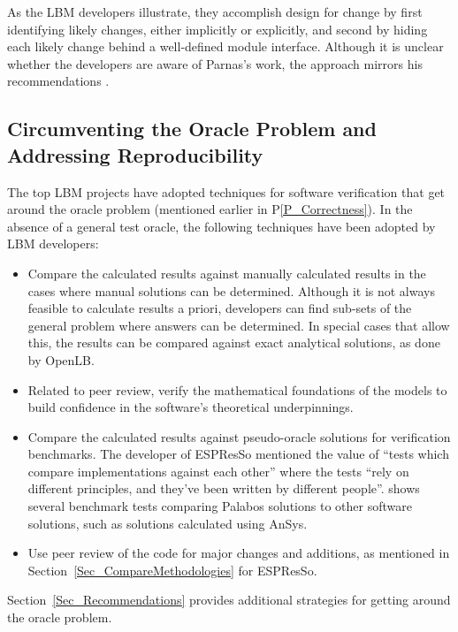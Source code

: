 \documentclass[final, 3p, times, authoryear]{elsarticle}
\newcommand{\ppref}[1]{P\ref{#1}}
\begin{document}
As the LBM developers illustrate, they accomplish design for change by first
identifying likely changes, either implicitly or explicitly, and second by
hiding each likely change behind a well-defined module interface.  Although it
is unclear whether the developers are aware of Parnas's work, the approach
mirrors his recommendations \citep{Parnas1972a}.

\subsection{Circumventing the Oracle Problem and Addressing Reproducibility}
\label{SecReproducibility}

The top LBM projects have adopted techniques for software verification that get
around the oracle problem (mentioned earlier in \ppref{P_Correctness}). In the
absence of a general test oracle, the following techniques have been adopted by
LBM developers:

\begin{itemize}
	\item Compare the calculated results against manually calculated results in
	the cases where manual solutions can be determined.  Although it is not
	always feasible to calculate results a priori, developers can find sub-sets
	of the general problem where answers can be determined.  In special cases
	that allow this, the results can be compared against exact analytical
	solutions, as done by OpenLB.
	\item Related to peer review, verify the mathematical foundations of the
	models to build confidence in the software's theoretical underpinnings.
	\item Compare the calculated results against pseudo-oracle solutions for
	verification benchmarks. The developer of ESPResSo mentioned the value of
	``tests which compare implementations against each other'' where the tests
	``rely on different principles, and they've been written by different
	people''. \citet{latt2021palabos} shows several benchmark tests comparing
	Palabos solutions to other software solutions, such as solutions calculated
	using AnSys.
	\item Use peer review of the code for major changes and additions, as
	mentioned in Section~\ref{Sec_CompareMethodologies} for ESPResSo. 
\end{itemize}

\noindent Section~\ref{Sec_Recommendations} provides additional strategies for
getting around the oracle problem.
\end{document}
